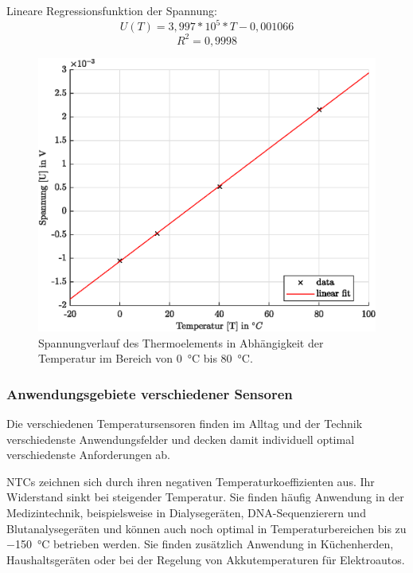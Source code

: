 Lineare Regressionsfunktion der Spannung:
\begin{equation*}
\label{eq:Spannung}
U(T)= 3,997*10^5*T-0,001066
\end{equation*}
\begin{equation*}
R^2=0,9998
\end{equation*}
\begin{figure}[H]
	\centering
	\includegraphics[height=0.2\textheight]{../MLAB/Spannung.eps}
	\caption[Spannungverlauf des Thermoelements in Abhängigkeit der Temperatur im Bereich von \SI{0}{\celsius} bis \SI{80}{\celsius} ]{Spannungverlauf des Thermoelements in Abhängigkeit der Temperatur im Bereich von \SI{0}{\celsius} bis \SI{80}{\celsius}.}
	\label{fig:Spannung}
\end{figure}

\subsubsection{Anwendungsgebiete verschiedener Sensoren}

Die verschiedenen Temperatursensoren finden im Alltag und der Technik verschiedenste Anwendungsfelder und decken damit individuell optimal verschiedenste Anforderungen ab. 

NTCs zeichnen sich durch ihren negativen Temperaturkoeffizienten aus. Ihr Widerstand sinkt bei steigender Temperatur. Sie finden häufig Anwendung in der Medizintechnik, beispielsweise in Dialysegeräten, DNA-Sequenzierern und Blutanalysegeräten und können auch noch optimal in Temperaturbereichen bis zu \SI{-150}{\celsius} betrieben werden. Sie finden zusätzlich Anwendung in Küchenherden, Haushaltsgeräten oder bei der Regelung von Akkutemperaturen für Elektroautos.\cite{quelle.2020} 

